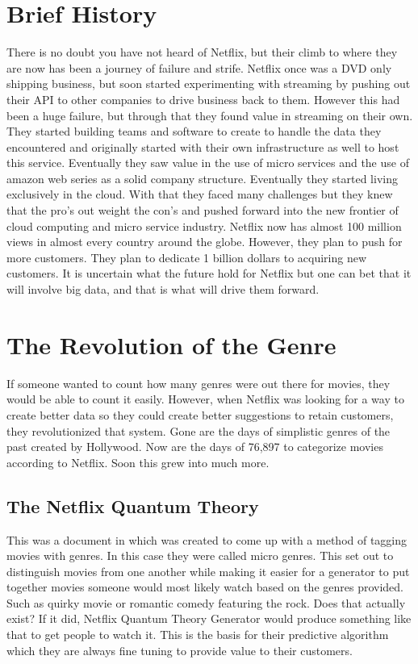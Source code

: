 \documentclass[sigconf]{acmart}
\begin{document}
\section{Brief History}
There is no doubt you have not heard of Netflix, but their climb to where they are now has been a journey of failure and strife.  Netflix once was a DVD only shipping business, but soon started experimenting with streaming by pushing out their API to other companies to drive business back to them.  However this had been a huge failure, but through that they found value in streaming on their own.  They started building teams and software to create to handle the data they encountered and originally started with their own infrastructure as well to host this service.  Eventually they saw value in the use of micro services and the use of amazon web series as a solid company structure.  Eventually they started living exclusively in the cloud.  With that they faced many challenges but they knew that the pro's out weight the con's and pushed forward into the new frontier of cloud computing and micro service industry.  Netflix now has almost 100 million views in almost every country around the globe.  However, they plan to push for more customers.  They plan to dedicate 1 billion dollars to acquiring new customers.  It is uncertain what the future hold for Netflix but one can bet that it will involve big data, and that is what will drive them forward.\cite{Marr}
\section{The Revolution of the Genre}
If someone wanted to count how many genres were out there for movies, they would be able to count it easily.  However, when Netflix was looking for a way to create better data so they could create better suggestions to retain customers, they revolutionized that system.  Gone are the days of simplistic genres of the past created by Hollywood.  Now are the days of 76,897 to categorize movies according to Netflix. \cite{Madrigal}  Soon this grew into much more.  
\subsection{The Netflix Quantum Theory}
This was a document in which was created to come up with a method of tagging movies with genres.  In this case they were called micro genres.  This set out to distinguish movies from one another while making it easier for a generator to put together movies someone would most likely watch based on the genres provided.  Such as quirky movie or romantic comedy featuring the rock.  Does that actually exist?  If it did, Netflix Quantum Theory Generator would produce something like that to get people to watch it.  This is the basis for their predictive algorithm which they are always fine tuning to provide value to their customers.
\end{document}
